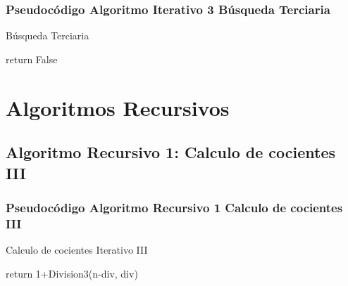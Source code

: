     \subsubsection{Pseudocódigo Algoritmo Iterativo 3 Búsqueda Terciaria }
        \begin{algorithm}
            \caption{Búsqueda Terciaria 
            }\label{alg:two}
            return False\;
            
            
        \end{algorithm}

\newpage

\section{Algoritmos Recursivos}
    \subsection{Algoritmo Recursivo 1: Calculo de cocientes III}
   
    \subsubsection{Pseudocódigo Algoritmo Recursivo 1 Calculo de cocientes III}
        \begin{algorithm}
            \caption{Calculo de cocientes Iterativo III 
            }\label{alg:two}
            {
                return 1+Division3(n-div, div)\;
            }
        \end{algorithm}
        
